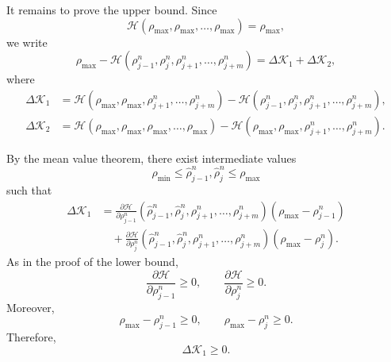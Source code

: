 It remains to prove the upper bound. Since
\[
    \mathcal H(\rho_{\max},\rho_{\max},\dots,\rho_{\max})
    =
    \rho_{\max},
\]
we write
\[
    \rho_{\max}
    -
    \mathcal H(\rho_{j-1}^n,\rho_j^n,\rho_{j+1}^n,\dots,\rho_{j+m}^n)
    =
    \Delta \mathcal K_1+\Delta \mathcal K_2,
\]
where
\[
    \begin{aligned}
        \Delta \mathcal K_1
         & =
        \mathcal H(\rho_{\max},\rho_{\max},\rho_{j+1}^n,\dots,\rho_{j+m}^n)
        -
        \mathcal H(\rho_{j-1}^n,\rho_j^n,\rho_{j+1}^n,\dots,\rho_{j+m}^n),
        \\
        \Delta \mathcal K_2
         & =
        \mathcal H(\rho_{\max},\rho_{\max},\rho_{\max},\dots,\rho_{\max})
        -
        \mathcal H(\rho_{\max},\rho_{\max},\rho_{j+1}^n,\dots,\rho_{j+m}^n).
    \end{aligned}
\]

By the mean value theorem, there exist intermediate values
\[
    \rho_{\min}\le \widehat\rho_{j-1}^n,\widehat\rho_j^n\le \rho_{\max}
\]
such that
\[
    \begin{aligned}
        \Delta \mathcal K_1
         & =
        \frac{\partial \mathcal H}{\partial \rho_{j-1}^n}
        (\widehat\rho_{j-1}^n,\widehat\rho_j^n,\rho_{j+1}^n,\dots,\rho_{j+m}^n)
        (\rho_{\max}-\rho_{j-1}^n)
        \\
         & \quad+
        \frac{\partial \mathcal H}{\partial \rho_j^n}
        (\widehat\rho_{j-1}^n,\widehat\rho_j^n,\rho_{j+1}^n,\dots,\rho_{j+m}^n)
        (\rho_{\max}-\rho_j^n).
    \end{aligned}
\]
As in the proof of the lower bound,
\[
    \frac{\partial \mathcal H}{\partial \rho_{j-1}^n}\ge 0,
    \qquad
    \frac{\partial \mathcal H}{\partial \rho_j^n}\ge 0.
\]
Moreover,
\[
    \rho_{\max}-\rho_{j-1}^n\ge 0,
    \qquad
    \rho_{\max}-\rho_j^n\ge 0.
\]
Therefore,
\[
    \Delta \mathcal K_1\ge 0.
\]

